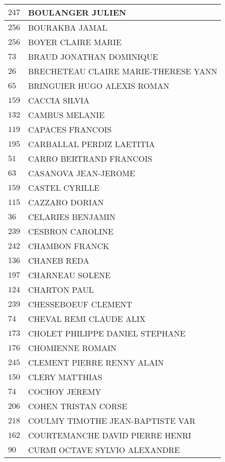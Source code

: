 \begin{xltabular}{\linewidth}{|l|X|}
    \hline
    $247$ & BOULANGER JULIEN \\
    \hline
    $256$ & BOURAKBA JAMAL \\
    \hline
    $256$ & BOYER CLAIRE MARIE \\
    \hline
    $73$ & BRAUD JONATHAN DOMINIQUE \\
    \hline
    $26$ & BRECHETEAU CLAIRE MARIE-THERESE YANN \\
    \hline
    $65$ & BRINGUIER HUGO ALEXIS ROMAN \\
    \hline
    $159$ & CACCIA SILVIA \\
    \hline
    $132$ & CAMBUS MELANIE \\
    \hline
    $119$ & CAPACES FRANCOIS \\
    \hline
    $195$ & CARBALLAL PERDIZ LAETITIA \\
    \hline
    $51$ & CARRO BERTRAND FRANCOIS \\
    \hline
    $63$ & CASANOVA JEAN-JEROME \\
    \hline
    $159$ & CASTEL CYRILLE \\
    \hline
    $115$ & CAZZARO DORIAN \\
    \hline
    $36$ & CELARIES BENJAMIN \\
    \hline
    $239$ & CESBRON CAROLINE \\
    \hline
    $242$ & CHAMBON FRANCK \\
    \hline
    $136$ & CHANEB REDA \\
    \hline
    $197$ & CHARNEAU SOLENE \\
    \hline
    $124$ & CHARTON PAUL \\
    \hline
    $239$ & CHESSEBOEUF CLEMENT \\
    \hline
    $74$ & CHEVAL REMI CLAUDE ALIX \\
    \hline
    $173$ & CHOLET PHILIPPE DANIEL STEPHANE \\
    \hline
    $176$ & CHOMIENNE ROMAIN \\
    \hline
    $245$ & CLEMENT PIERRE RENNY ALAIN \\
    \hline
    $150$ & CLERY MATTHIAS \\
    \hline
    $74$ & COCHOY JEREMY \\
    \hline
    $206$ & COHEN TRISTAN CORSE \\
    \hline
    $218$ & COULMY TIMOTHE JEAN-BAPTISTE VAR \\
    \hline
    $162$ & COURTEMANCHE DAVID PIERRE HENRI \\
    \hline
    $90$ & CURMI OCTAVE SYLVIO ALEXANDRE \\

\end{xltabular}
